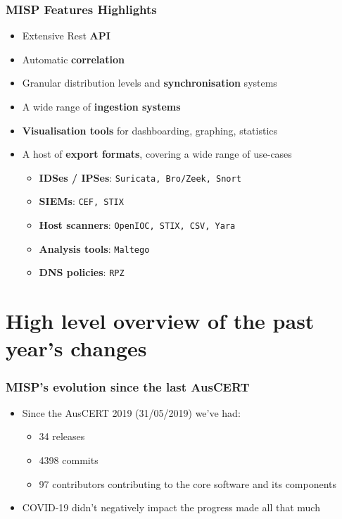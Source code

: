 \begin{frame}
\frametitle{MISP Features Highlights}
    \begin{itemize}
        \item Extensive Rest {\bf API}
        \item Automatic {\bf correlation}
        \item Granular distribution levels and {\bf synchronisation} systems
        \item A wide range of {\bf ingestion systems}
        \item {\bf Visualisation tools} for dashboarding, graphing, statistics
        \item A host of {\bf export formats}, covering a wide range of use-cases
        \begin{itemize}
            \item {\bf IDSes / IPSes}: \texttt{Suricata, Bro/Zeek, Snort}
            \item {\bf SIEMs}: \texttt{CEF, STIX}
            \item {\bf Host scanners}:  \texttt{OpenIOC, STIX, CSV, Yara}
            \item {\bf Analysis tools}: \texttt{Maltego}
            \item {\bf DNS policies}: \texttt{RPZ}
        \end{itemize}
    \end{itemize}
\end{frame}

\section{High level overview of the past year's changes}

\begin{frame}
  \frametitle{MISP's evolution since the last AusCERT}
  \begin{itemize}
    \item Since the AusCERT 2019 (31/05/2019) we've had:
    \begin{itemize}
        \item 34 releases
        \item 4398 commits
        \item 97 contributors contributing to the core software and its components
    \end{itemize}
    \item COVID-19 didn't negatively impact the progress made all that much
  \end{itemize}
\end{frame}

